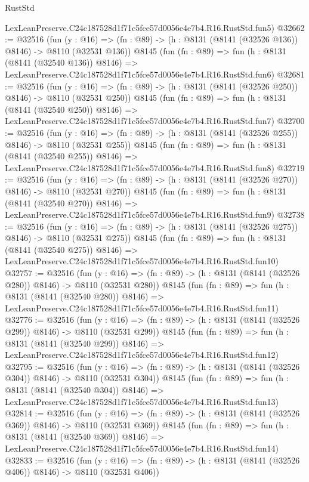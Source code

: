 \begin{lexlean}{RustStd}
\begin{coremodule}
    LexLeanPreserve.C24c187528d1f71c5fce57d0056e4e7b4.R16.RustStd.fun5)
@32662 := @32516
    (fun (y : @16) => (fn : @89) -> (h : @8131 (@8141 (@32526 @136)) @8146) -> @8110 (@32531 @136))
    @8145
    (fun (fn : @89) =>
    fun (h : @8131 (@8141 (@32540 @136)) @8146) =>
    LexLeanPreserve.C24c187528d1f71c5fce57d0056e4e7b4.R16.RustStd.fun6)
@32681 := @32516
    (fun (y : @16) => (fn : @89) -> (h : @8131 (@8141 (@32526 @250)) @8146) -> @8110 (@32531 @250))
    @8145
    (fun (fn : @89) =>
    fun (h : @8131 (@8141 (@32540 @250)) @8146) =>
    LexLeanPreserve.C24c187528d1f71c5fce57d0056e4e7b4.R16.RustStd.fun7)
@32700 := @32516
    (fun (y : @16) => (fn : @89) -> (h : @8131 (@8141 (@32526 @255)) @8146) -> @8110 (@32531 @255))
    @8145
    (fun (fn : @89) =>
    fun (h : @8131 (@8141 (@32540 @255)) @8146) =>
    LexLeanPreserve.C24c187528d1f71c5fce57d0056e4e7b4.R16.RustStd.fun8)
@32719 := @32516
    (fun (y : @16) => (fn : @89) -> (h : @8131 (@8141 (@32526 @270)) @8146) -> @8110 (@32531 @270))
    @8145
    (fun (fn : @89) =>
    fun (h : @8131 (@8141 (@32540 @270)) @8146) =>
    LexLeanPreserve.C24c187528d1f71c5fce57d0056e4e7b4.R16.RustStd.fun9)
@32738 := @32516
    (fun (y : @16) => (fn : @89) -> (h : @8131 (@8141 (@32526 @275)) @8146) -> @8110 (@32531 @275))
    @8145
    (fun (fn : @89) =>
    fun (h : @8131 (@8141 (@32540 @275)) @8146) =>
    LexLeanPreserve.C24c187528d1f71c5fce57d0056e4e7b4.R16.RustStd.fun10)
@32757 := @32516
    (fun (y : @16) => (fn : @89) -> (h : @8131 (@8141 (@32526 @280)) @8146) -> @8110 (@32531 @280))
    @8145
    (fun (fn : @89) =>
    fun (h : @8131 (@8141 (@32540 @280)) @8146) =>
    LexLeanPreserve.C24c187528d1f71c5fce57d0056e4e7b4.R16.RustStd.fun11)
@32776 := @32516
    (fun (y : @16) => (fn : @89) -> (h : @8131 (@8141 (@32526 @299)) @8146) -> @8110 (@32531 @299))
    @8145
    (fun (fn : @89) =>
    fun (h : @8131 (@8141 (@32540 @299)) @8146) =>
    LexLeanPreserve.C24c187528d1f71c5fce57d0056e4e7b4.R16.RustStd.fun12)
@32795 := @32516
    (fun (y : @16) => (fn : @89) -> (h : @8131 (@8141 (@32526 @304)) @8146) -> @8110 (@32531 @304))
    @8145
    (fun (fn : @89) =>
    fun (h : @8131 (@8141 (@32540 @304)) @8146) =>
    LexLeanPreserve.C24c187528d1f71c5fce57d0056e4e7b4.R16.RustStd.fun13)
@32814 := @32516
    (fun (y : @16) => (fn : @89) -> (h : @8131 (@8141 (@32526 @369)) @8146) -> @8110 (@32531 @369))
    @8145
    (fun (fn : @89) =>
    fun (h : @8131 (@8141 (@32540 @369)) @8146) =>
    LexLeanPreserve.C24c187528d1f71c5fce57d0056e4e7b4.R16.RustStd.fun14)
@32833 := @32516
    (fun (y : @16) => (fn : @89) -> (h : @8131 (@8141 (@32526 @406)) @8146) -> @8110 (@32531 @406))

\end{coremodule}
\end{lexlean}
